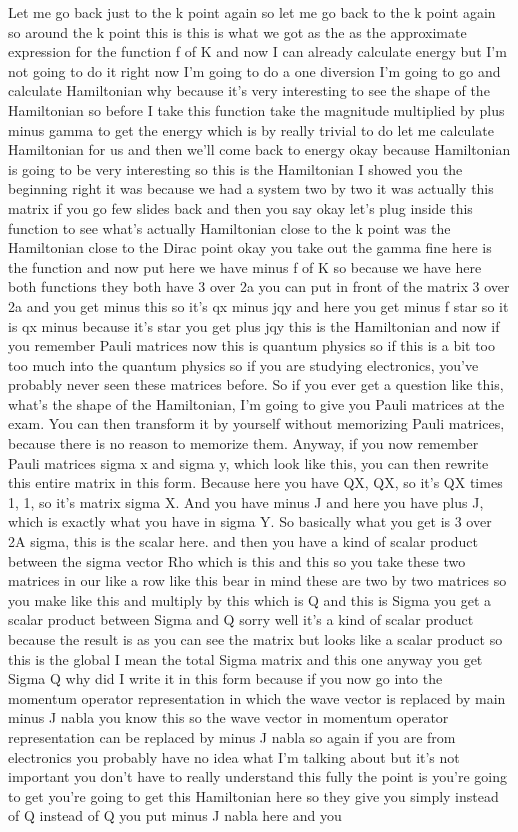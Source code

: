 Let me go back just to the k point again so let me go back to the k point again so around the k point this is this is what we got as the as the approximate expression for the function f of K and now I can already calculate energy but I'm not going to do it right now I'm going to do a one diversion I'm going to go and calculate Hamiltonian why because it's very interesting to see the shape of the Hamiltonian so before I take this function take the magnitude multiplied by plus minus gamma to get the energy which is by really trivial to do let me calculate Hamiltonian for us and then we'll come back to energy okay because Hamiltonian is going to be very interesting so this is the Hamiltonian I showed you the beginning right it was because we had a system two by two it was actually this matrix if you go few slides back and then you say okay let's plug inside this function to see what's actually Hamiltonian close to the k point was the Hamiltonian close to the Dirac point okay you take out the gamma fine here is the function and now put here we have minus f of K so because we have here both functions they both have 3 over 2a you can put in front of the matrix 3 over 2a and you get minus this so it's qx minus jqy and here you get minus f star so it is qx minus because it's star you get plus jqy this is the Hamiltonian and now if you remember Pauli matrices now this is quantum physics so if this is a bit too too much into the quantum physics so if you are studying electronics, you've probably never seen these matrices before. So if you ever get a question like this, what's the shape of the Hamiltonian, I'm going to give you Pauli matrices at the exam. You can then transform it by yourself without memorizing Pauli matrices, because there is no reason to memorize them. Anyway, if you now remember Pauli matrices sigma x and sigma y, which look like this, you can then rewrite this entire matrix in this form. Because here you have QX, QX, so it's QX times 1, 1, so it's matrix sigma X. And you have minus J and here you have plus J, which is exactly what you have in sigma Y. So basically what you get is 3 over 2A sigma, this is the scalar here. and then you have a kind of scalar product between the sigma vector Rho which is this and this so you take these two matrices in our like a row like this bear in mind these are two by two matrices so you make like this and multiply by this which is Q and this is Sigma you get a scalar product between Sigma and Q sorry well it's a kind of scalar product because the result is as you can see the matrix but looks like a scalar product so this is the global I mean the total Sigma matrix and this one anyway you get Sigma Q why did I write it in this form because if you now go into the momentum operator representation in which the wave vector is replaced by main minus J nabla you know this so the wave vector in momentum operator representation can be replaced by minus J nabla so again if you are from electronics you probably have no idea what I'm talking about but it's not important you don't have to really understand this fully the point is you're going to get you're going to get this Hamiltonian here so they give you simply instead of Q instead of Q you put minus J nabla here and you 